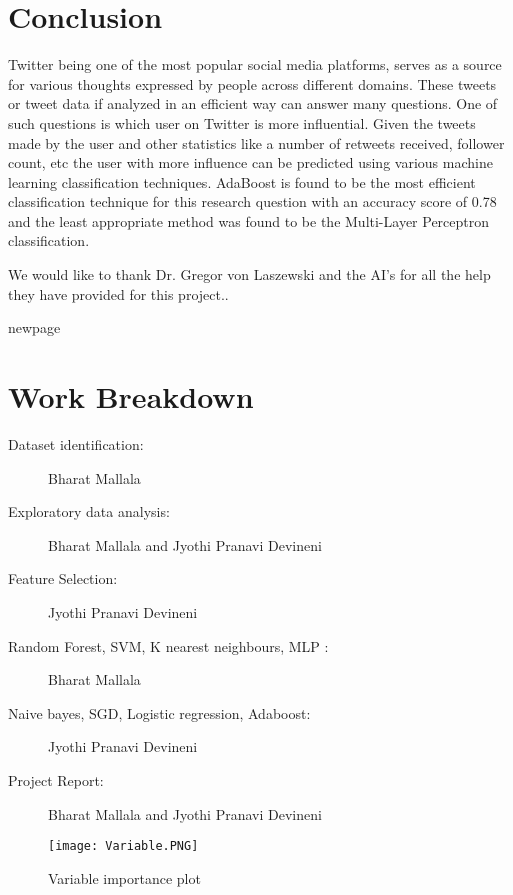 \documentclass[sigconf]{acmart}
\begin{document}
\section{Conclusion}
Twitter being one of the most popular social media platforms, serves as a source for various thoughts expressed by people across different domains. These tweets or tweet data if analyzed in an efficient way can answer many questions. One of such questions is which user on Twitter is more influential. Given the tweets made by the user and other statistics like a number of retweets received, follower count, etc the user with more influence can be predicted using various machine learning classification techniques. AdaBoost is found to be the most efficient classification technique for this research question with an accuracy score of 0.78 and the least appropriate method was found to be the Multi-Layer Perceptron classification.  


\begin{acks}
We would like to thank Dr. Gregor von Laszewski and the AI's for all the help they have provided for this project..
\end{acks}

newpage
\appendix 
\section{Work Breakdown} 
\begin{description} 
\item[Dataset identification:]Bharat Mallala
\item[Exploratory data analysis:] Bharat Mallala and Jyothi Pranavi Devineni
\item[Feature Selection:] Jyothi Pranavi Devineni
\item[Random Forest, SVM, K nearest neighbours, MLP :] Bharat Mallala
\item[Naive bayes, SGD, Logistic regression, Adaboost:] Jyothi Pranavi Devineni
\item[Project Report:] Bharat Mallala and Jyothi Pranavi Devineni
\end{description} 


 

\clearpage
\begin{figure}[htp]
    \texttt{[image: Variable.PNG]}
    \caption{Variable importance plot}
    \label{fig:figure1}
\end{figure}
\end{document}
